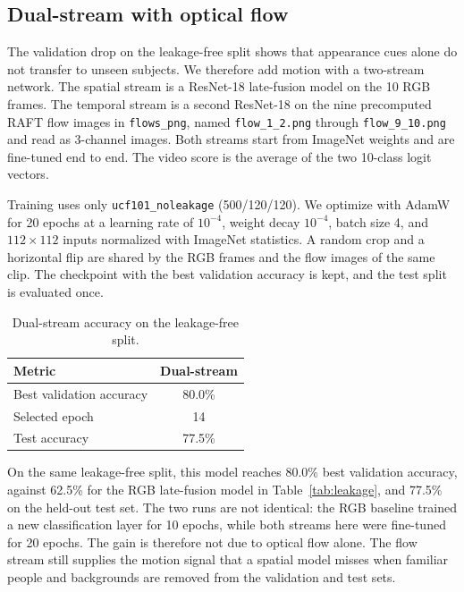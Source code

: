 \subsection{Dual-stream with optical flow}
The validation drop on the leakage-free split shows that appearance cues alone do not transfer to unseen subjects. We therefore add motion with a two-stream network. The spatial stream is a ResNet-18 late-fusion model on the 10 RGB frames. The temporal stream is a second ResNet-18 on the nine precomputed RAFT flow images in \texttt{flows\_png}, named \texttt{flow\_1\_2.png} through \texttt{flow\_9\_10.png} and read as 3-channel images. Both streams start from ImageNet weights and are fine-tuned end to end. The video score is the average of the two 10-class logit vectors.

Training uses only \texttt{ucf101\_noleakage} (500/120/120). We optimize with AdamW for 20 epochs at a learning rate of $10^{-4}$, weight decay $10^{-4}$, batch size 4, and $112\times 112$ inputs normalized with ImageNet statistics. A random crop and a horizontal flip are shared by the RGB frames and the flow images of the same clip. The checkpoint with the best validation accuracy is kept, and the test split is evaluated once.

\begin{table}[htbp]
    \centering
    \caption{Dual-stream accuracy on the leakage-free split.}
    \label{tab:dual}
    \small
    \begin{tabular}{lc}
        \hline
        Metric & Dual-stream \\
        \hline
        Best validation accuracy & 80.0\% \\
        Selected epoch & 14 \\
        Test accuracy & 77.5\% \\
        \hline
    \end{tabular}
\end{table}

On the same leakage-free split, this model reaches 80.0\% best validation accuracy, against 62.5\% for the RGB late-fusion model in Table~\ref{tab:leakage}, and 77.5\% on the held-out test set. The two runs are not identical: the RGB baseline trained a new classification layer for 10 epochs, while both streams here were fine-tuned for 20 epochs. The gain is therefore not due to optical flow alone. The flow stream still supplies the motion signal that a spatial model misses when familiar people and backgrounds are removed from the validation and test sets.
